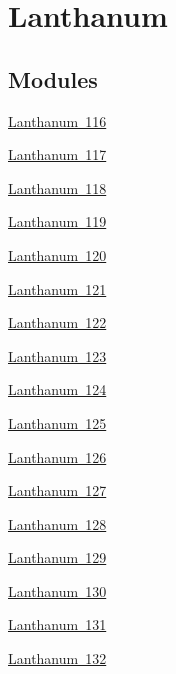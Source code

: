\hypertarget{group___isotope_const-_lanthanum}{}\section{Lanthanum}
\label{group___isotope_const-_lanthanum}
\subsection*{Modules}
\begin{DoxyCompactItemize}
\item 
\mbox{\hyperlink{group___isotope_const-_lanthanum-_la116}{Lanthanum 116}}
\item 
\mbox{\hyperlink{group___isotope_const-_lanthanum-_la117}{Lanthanum 117}}
\item 
\mbox{\hyperlink{group___isotope_const-_lanthanum-_la118}{Lanthanum 118}}
\item 
\mbox{\hyperlink{group___isotope_const-_lanthanum-_la119}{Lanthanum 119}}
\item 
\mbox{\hyperlink{group___isotope_const-_lanthanum-_la120}{Lanthanum 120}}
\item 
\mbox{\hyperlink{group___isotope_const-_lanthanum-_la121}{Lanthanum 121}}
\item 
\mbox{\hyperlink{group___isotope_const-_lanthanum-_la122}{Lanthanum 122}}
\item 
\mbox{\hyperlink{group___isotope_const-_lanthanum-_la123}{Lanthanum 123}}
\item 
\mbox{\hyperlink{group___isotope_const-_lanthanum-_la124}{Lanthanum 124}}
\item 
\mbox{\hyperlink{group___isotope_const-_lanthanum-_la125}{Lanthanum 125}}
\item 
\mbox{\hyperlink{group___isotope_const-_lanthanum-_la126}{Lanthanum 126}}
\item 
\mbox{\hyperlink{group___isotope_const-_lanthanum-_la127}{Lanthanum 127}}
\item 
\mbox{\hyperlink{group___isotope_const-_lanthanum-_la128}{Lanthanum 128}}
\item 
\mbox{\hyperlink{group___isotope_const-_lanthanum-_la129}{Lanthanum 129}}
\item 
\mbox{\hyperlink{group___isotope_const-_lanthanum-_la130}{Lanthanum 130}}
\item 
\mbox{\hyperlink{group___isotope_const-_lanthanum-_la131}{Lanthanum 131}}
\item 
\mbox{\hyperlink{group___isotope_const-_lanthanum-_la132}{Lanthanum 132}}

\end{DoxyCompactItemize}
